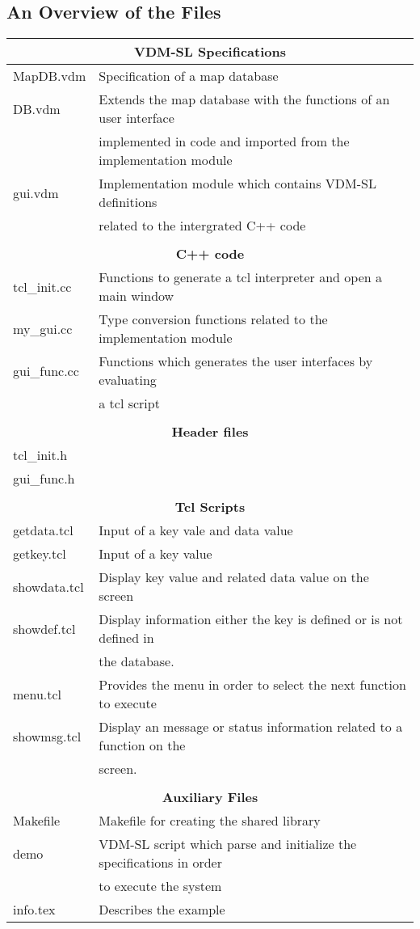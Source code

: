 \begin{appendix}
\section{An Overview of the Files}
\begin{tabular}{|l|l|}
\hline
\multicolumn{2}{|c|}{\bf VDM-SL Specifications}\\
\hline
MapDB.vdm & Specification of a map database\\
DB.vdm & Extends the map database with the functions of an user interface\\
& implemented in code and imported from the implementation module\\
gui.vdm & Implementation module which contains VDM-SL definitions \\
&  related to the intergrated C++ code\\
\hline
\multicolumn{2}{|c|}{ }\\
\hline
\multicolumn{2}{|c|}{\bf C++ code}\\
\hline
tcl\_init.cc & Functions to generate a tcl interpreter and open a main window \\
my\_gui.cc & Type conversion functions related to the implementation module\\
gui\_func.cc & Functions which generates the user interfaces by evaluating \\
& a tcl script\\
\hline
\multicolumn{2}{|c|}{ }\\
\hline
\multicolumn{2}{|c|}{\bf Header files}\\
\hline
tcl\_init.h &\\
gui\_func.h&\\
\hline
\multicolumn{2}{|c|}{ }\\
\hline
\multicolumn{2}{|c|}{\bf Tcl Scripts}\\
\hline
getdata.tcl & Input of a key vale and data value\\
getkey.tcl & Input of a key value\\
showdata.tcl & Display key value and related data value on the screen\\
showdef.tcl & Display information either the key is defined or is not defined in\\
& the database.\\
menu.tcl & Provides the menu in order to select the next function to execute\\
showmsg.tcl & Display an message or status information related to a function on the \\
&screen.\\
\hline
\multicolumn{2}{|c|}{ }\\
\hline
\multicolumn{2}{|c|}{\bf Auxiliary Files}\\
\hline
Makefile & Makefile for creating the shared library\\
demo & VDM-SL script which parse and initialize the specifications in order \\
& to execute the system\\
info.tex & Describes the example\\
\hline
\end{tabular}
\end{appendix}

